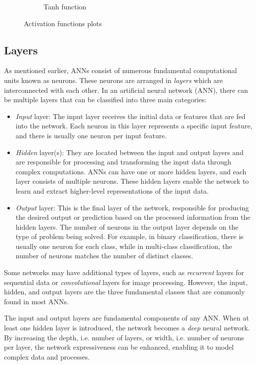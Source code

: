 \begin{figure}[h]
\begin{subfigure}{.33\textwidth}
		\caption{Tanh function}
		\label{fig:tanh}
	\end{subfigure}
	\caption{Activation functions plots}
\end{figure}

\subsection{Layers}

As mentioned earlier, ANNs consist of numerous fundamental computational units known as neurons. These neurons are arranged in \textit{layers} which are interconnected with each other. In an artificial neural network (ANN), there can be multiple layers that can be classified into three main categories:

\begin{itemize}
	\item \textit{Input} layer: The input layer receives the initial data or features that are fed into the network. Each neuron in this layer represents a specific input feature, and there is usually one neuron per input feature.
	
	\item \textit{Hidden} layer(s): They are located between the input and output layers and are responsible for processing and transforming the input data through complex computations. ANNs can have one or more hidden layers, and each layer consists of multiple neurons. These hidden layers enable the network to learn and extract higher-level representations of the input data.
	
	\item \textit{Output} layer: This is the final layer of the network, responsible for producing the desired output or prediction based on the processed information from the hidden layers. The number of neurons in the output layer depends on the type of problem being solved. For example, in binary classification, there is usually one neuron for each class, while in multi-class classification, the number of neurons matches the number of distinct classes.
\end{itemize}

Some networks may have additional types of layers, such as \textit{recurrent} layers for sequential data or \textit{convolutional} layers for image processing. However, the input, hidden, and output layers are the three fundamental classes that are commonly found in most ANNs.

The input and output layers are fundamental components of any ANN. When at least one hidden layer is introduced, the network becomes a \textit{deep} neural network. By increasing the depth, i.e. number of layers, or width, i.e. number of neurons per layer, the network expressiveness can be enhanced, enabling it to model complex data and processes.

